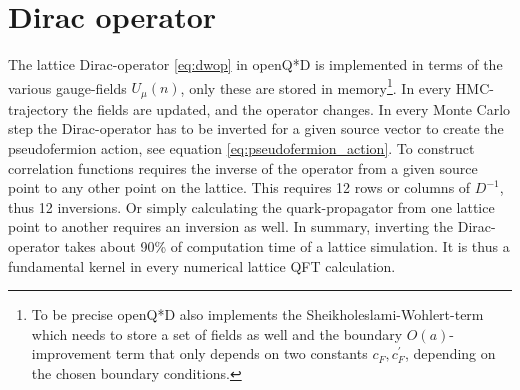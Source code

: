 \documentclass{article}
\theoremstyle{plain} %
\theoremstyle{convention} %
\theoremstyle{remark} %
\numberwithin{equation}{section}
\begin{document}
\section{Dirac operator}

\label{sec:dop}

The lattice Dirac-operator \eqref{eq:dwop} in openQ*D is implemented in terms of the various gauge-fields $U_{\mu}(n)$, only these are stored in memory\footnote{To be precise openQ*D also implements the Sheikholeslami-Wohlert-term \cite{sheikholeslami1985} which needs to store a set of fields as well and the boundary $O(a)$-improvement term that only depends on two constants $c_F, c^{\prime}_F$, depending on the chosen boundary conditions.}. In every HMC-trajectory the fields are updated, and the operator changes. In every Monte Carlo step the Dirac-operator has to be inverted for a given source vector to create the pseudofermion action, see equation \eqref{eq:pseudofermion_action}. To construct correlation functions requires the inverse of the operator from a given source point to any other point on the lattice. This requires \num{12} rows or columns of $D^{-1}$, thus \num{12} inversions. Or simply calculating the quark-propagator from one lattice point to another requires an inversion as well. In summary, inverting the Dirac-operator takes about \num{90}\% of computation time of a lattice simulation. It is thus a fundamental kernel in every numerical lattice QFT calculation.
\end{document}
